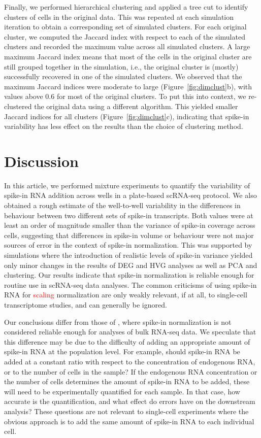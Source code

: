 \documentclass{article}
\newcommand{\revised}[1]{\textcolor{red}{#1}}
\begin{document}
Finally, we performed hierarchical clustering and applied a tree cut to identify clusters of cells in the original data.
This was repeated at each simulation iteration to obtain a corresponding set of simulated clusters.
For each original cluster, we computed the Jaccard index with respect to each of the simulated clusters and recorded the maximum value across all simulated clusters.
A large maximum Jaccard index means that most of the cells in the original cluster are still grouped together in the simulation,
i.e., the original cluster is (mostly) successfully recovered in one of the simulated clusters.
We observed that the maximum Jaccard indices were moderate to large (Figure~\ref{fig:dimclust}b), with values above 0.6 for most of the original clusters.
To put this into context, we re-clustered the original data using a different algorithm.
This yielded smaller Jaccard indices for all clusters (Figure~\ref{fig:dimclust}c), indicating that spike-in variability has less effect on the results than the choice of clustering method.

\section*{Discussion}
In this article, we performed mixture experiments to quantify the variability of spike-in RNA addition across wells in a plate-based scRNA-seq protocol.
We also obtained a rough estimate of the well-to-well variability in the differences in behaviour between two different sets of spike-in transcripts.
Both values were at least an order of magnitude smaller than the variance of spike-in coverage across cells, suggesting that differences in spike-in volume or behaviour were not major sources of error in the context of spike-in normalization.
This was supported by simulations where the introduction of realistic levels of spike-in variance yielded only minor changes in the results of DEG and HVG analyses as well as PCA and clustering.
Our results indicate that spike-in normalization is reliable enough for routine use in scRNA-seq data analyses.
The common criticisms of using spike-in RNA for \revised{scaling} normalization are only weakly relevant, if at all, to single-cell transcriptome studies, and can generally be ignored.

Our conclusions differ from those of \citet{risso2014normalization}, where spike-in normalization is not considered reliable enough for analyses of bulk RNA-seq data.
We speculate that this difference may be due to the difficulty of adding an appropriate amount of spike-in RNA at the population level.
For example, should spike-in RNA be added at a constant ratio with respect to the concentration of endogenous RNA, or to the number of cells in the sample?
If the endogenous RNA concentration or the number of cells determines the amount of spike-in RNA to be added, these will need to be experimentally quantified for each sample.
In that case, how accurate is the quantification, and what effect do errors have on the downstream analysis?
These questions are not relevant to single-cell experiments where the obvious approach is to add the same amount of spike-in RNA to each individual cell.
\end{document}
